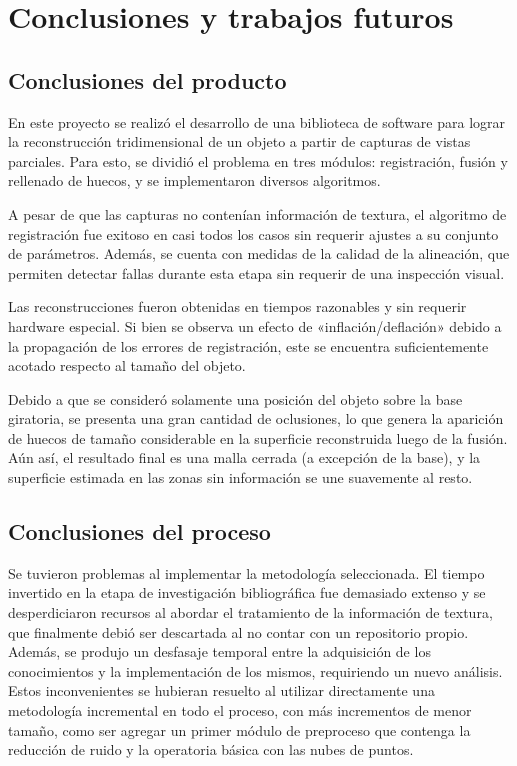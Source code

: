 \chapter{Conclusiones y trabajos futuros}

\section{Conclusiones del producto}
	En este proyecto se realizó el desarrollo de una biblioteca de software para lograr
	la reconstrucción tridimensional de un objeto a partir de capturas de
	vistas parciales.
	Para esto, se dividió el problema en tres módulos: registración, fusión y
	rellenado de huecos, y se implementaron diversos algoritmos.

	A pesar de que las capturas no contenían información de textura,
	el algoritmo de registración fue exitoso en casi todos los casos sin requerir
	ajustes a su conjunto de parámetros. 
	Además, se cuenta con medidas de la calidad de la alineación,
	que permiten detectar fallas durante esta etapa sin requerir de una inspección visual.


	Las reconstrucciones fueron obtenidas en tiempos razonables y sin requerir hardware especial.
	Si bien se observa un efecto de «inflación/deflación» debido a la propagación de los errores de registración,
	este se encuentra suficientemente acotado respecto al tamaño del objeto.

	Debido a que se consideró solamente una posición del objeto sobre la base giratoria,
	se presenta una gran cantidad de oclusiones,
	lo que genera la aparición de huecos de tamaño considerable
	en la superficie reconstruida luego de la fusión.
	Aún así, el resultado final es una malla cerrada (a excepción de la base), y la
	superficie estimada en las zonas sin información se une suavemente al resto.

\section{Conclusiones del proceso}
Se tuvieron problemas al implementar la metodología seleccionada.
El tiempo invertido en la etapa de investigación bibliográfica fue demasiado extenso
y se desperdiciaron recursos al abordar el tratamiento de la información de textura,
que finalmente debió ser descartada al no contar con un repositorio propio.
Además, se produjo un desfasaje temporal entre la adquisición de los conocimientos y la
implementación de los mismos, requiriendo un nuevo análisis.
Estos inconvenientes se hubieran resuelto
al utilizar directamente una metodología incremental en todo el proceso,
con más incrementos de menor tamaño, como ser agregar un primer módulo
de preproceso que contenga la reducción de ruido y la operatoria básica con las
nubes de puntos.

